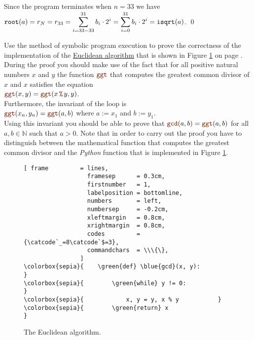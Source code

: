 Since the program terminates when $n=33$ we have
\\[0.2cm]
\hspace*{1.3cm}
$\displaystyle \mathtt{root}(a) = r_N = r_{33} = \sum\limits_{i=33-33}^{31} b_i \cdot 2^i = \sum\limits_{i=0}^{31} b_i \cdot 2^i = \mathtt{isqrt}(a)$. \qed


\exerciseEng
Use the method of symbolic program execution to prove the correctness of the implementation of the
\href{https://en.wikipedia.org/wiki/Euclidean_algorithm}{Euclidean algorithm} that is shown in Figure
\ref{fig:gcd.stlx} on page \pageref{fig:gcd.stlx}.  During the proof 
you should make use of the fact that for all positive natural numbers $x$ and $y$ the function $\mytt{ggt}$
that computes the greatest common divisor of $x$ and $x$ satisfies the equation
\\[0.2cm]
\hspace*{1.3cm}
$\mytt{ggt}(x, y) = \mytt{ggt}(x \,\mytt{\%}\, y, y)$.
\\[0.2cm]
Furthermore, the invariant of the  loop is
\\[0.2cm]
\hspace*{1.3cm}
$\mytt{ggt}(x_n, y_n) = \mytt{ggt}(a, b)$ \quad where $a := x_1$ and $b := y_1$.
\\[0.2cm]
Using this invariant you should be able to prove that $\mytt{gcd}(a, b) = \mytt{ggt}(a, b)$ for all
$a, b \in \mathbb{N}$ such that $a > 0$.  Note that in order to carry out the proof you have to distinguish
between the mathematical function  that computes the greatest common divisor and the \textsl{Python}
function  that is implemented in Figure \ref{fig:gcd.stlx}.
\eox

\begin{figure}[!ht]
\centering
\begin{Verbatim}[ frame         = lines, 
                  framesep      = 0.3cm, 
                  firstnumber   = 1,
                  labelposition = bottomline,
                  numbers       = left,
                  numbersep     = -0.2cm,
                  xleftmargin   = 0.8cm,
                  xrightmargin  = 0.8cm,
                  codes         = {\catcode`_=8\catcode`$=3},
                  commandchars  = \\\{\},
                ]
\colorbox{sepia}{    \green{def} \blue{gcd}(x, y):                    }
\colorbox{sepia}{        \green{while} y != 0:                 }
\colorbox{sepia}{            x, y = y, x % y           }
\colorbox{sepia}{        \green{return} x                      }
\end{Verbatim}
\vspace*{-0.3cm}
\caption{The Euclidean algorithm.}
\label{fig:gcd.stlx}
\end{figure}


